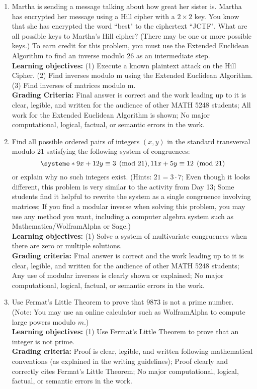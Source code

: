 \documentclass[12pt]{article}
\begin{document}
\begin{enumerate}

\item Martha is sending a message talking about how great her sister is.  Martha has encrypted her message using a Hill cipher with a $2\times 2$ key.  You know that she has encrypted the word ``best" to the ciphertext ``JCTF".  What are all possible keys to Martha's Hill cipher? (There may be one or more possible keys.) To earn credit for this problem, you must use the Extended Euclidean Algorithm to find an inverse modulo 26 as an intermediate step. \\
{\bf Learning objectives:} (1) Execute a known plaintext attack on the Hill Cipher. (2) Find inverses modulo m using the Extended Euclidean Algorithm.  (3) Find inverses of matrices modulo m.\\
{\bf Grading Criteria:} Final answer is correct and the work leading up to it is clear, legible, and written for the audience of other MATH 5248 students; All work for the Extended Euclidean Algorithm is shown; No major computational, logical, factual, or semantic errors in the work.

\item Find all possible ordered pairs of integers $(x,y)$ in the standard transversal modulo 21 satisfying the following system of congruences:
$$\systeme*{9x+12y\equiv 3\pmod{21}, 11x+5y\equiv 12\pmod{21}}$$ or explain why no such integers exist.  (Hints: $21=3\cdot 7$; Even though it looks different, this problem is very similar to the activity from Day 13; Some students find it helpful to rewrite the system as a single congruence involving matrices; If you find a modular inverse when solving this problem, you may use any method you want, including a computer algebra system such as Mathematica/WolframAlpha or Sage.)\\
{\bf Learning objectives:} (1) Solve a system of multivariate congruences when there are zero or multiple solutions.  \\
{\bf Grading criteria:} Final answer is correct and the work leading up to it is clear, legible, and written for the audience of other MATH 5248 students; Any use of modular inverses is clearly shown or explained; No major computational, logical, factual, or semantic errors in the work.

\item Use Fermat's Little Theorem to prove that $9873$ is not a prime number.  (Note: You may use an online calculator such as WolframAlpha to compute large powers modulo $m$.)\\
{\bf Learning objectives:} (1) Use Fermat's Little Theorem to prove that an integer is not prime.  \\
{\bf Grading criteria:} Proof is clear, legible, and written following mathematical conventions (as explained in the writing guidelines); Proof clearly and correctly cites Fermat's Little Theorem; No major computational, logical, factual, or semantic errors in the work.



\end{enumerate}
\end{document}
